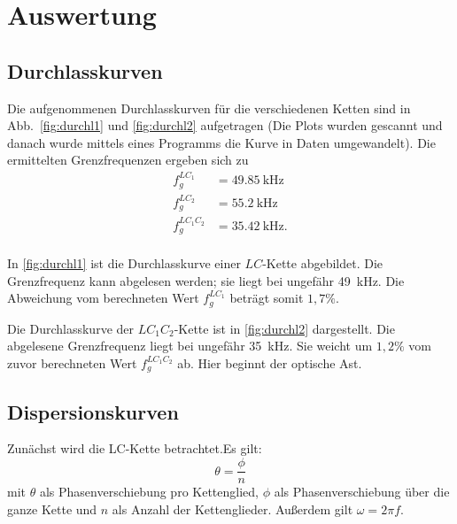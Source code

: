 \section{Auswertung}
\label{sec:Auswertung}

\subsection{Durchlasskurven}
Die aufgenommenen Durchlasskurven für die verschiedenen Ketten sind in Abb.~\ref{fig:durchl1} und \ref{fig:durchl2} aufgetragen (Die Plots wurden gescannt und danach wurde mittels eines Programms die Kurve in Daten umgewandelt). Die ermittelten Grenzfrequenzen ergeben sich zu
\begin{align}
  f_g^{LC_{1}} &= \SI{49,85}{\kilo\hertz} \\
  f_g^{LC_2} &= \SI{55,2}{\kilo\hertz} \\
  f_g^{LC_1C_2} &= \SI{35,42}{\kilo\hertz}. \\
\end{align}


In \ref{fig:durchl1} ist die Durchlasskurve einer $LC$-Kette abgebildet. Die Grenzfrequenz kann abgelesen werden; sie liegt bei ungefähr \SI{49}{\kilo\hertz}. Die Abweichung vom berechneten Wert $f_g^{LC_{1}}$ beträgt somit $1,7\%$.

Die Durchlasskurve der $LC_1C_2$-Kette ist in \ref{fig:durchl2} dargestellt. Die abgelesene Grenzfrequenz liegt bei ungefähr \SI{35}{\kilo\hertz}. Sie weicht um $1,2\%$ vom zuvor berechneten Wert $f_g^{LC_1C_2}$ ab. Hier beginnt der optische Ast.

\subsection{Dispersionskurven}
Zunächst wird die LC-Kette betrachtet.Es gilt:
\begin{equation}
  \theta = \frac{\phi}{n}
\end{equation}
mit $\theta$ als Phasenverschiebung pro Kettenglied, $\phi$ als Phasenverschiebung über die ganze Kette und $n$ als Anzahl der Kettenglieder.
Außerdem gilt $\omega = 2\pi f$.

